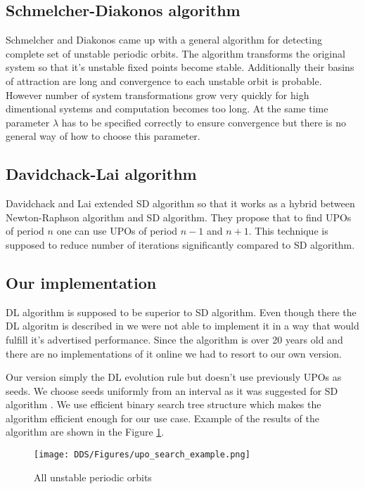 \subsection{Schmelcher-Diakonos algorithm}
Schmelcher and Diakonos came up with a general algorithm for detecting complete set of unstable periodic orbits.
The algorithm transforms the original system so that it's unstable fixed points become stable.
Additionally their basins of attraction are long and convergence to each unstable orbit is probable.
However number of system transformations grow very quickly for high dimentional systems and computation becomes too long.
At the same time parameter $\lambda$ has to be specified correctly to ensure convergence but there is no general way of how to choose this parameter. \cite{Schmelcher1997}

\subsection{Davidchack-Lai algorithm}
Davidchack and Lai extended SD algorithm so that it works as a hybrid between Newton-Raphson algorithm and SD algorithm.
They propose that to find UPOs of period $n$ one can use UPOs of period $n-1$ and $n+1$.
This technique is supposed to reduce number of iterations significantly compared to SD algorithm. \cite{Davidchack1999}

\subsection{Our implementation}
DL algorithm is supposed to be superior to SD algorithm.
Even though there the DL algoritm is described in \cite{Davidchack1999,Davidchack2001,Klebanoff2001} we were not able to implement it in a way that would fulfill it's advertised performance.
Since the algorithm is over 20 years old and there are no implementations of it online we had to resort to our own version.
\par
Our version simply the DL evolution rule but doesn't use previously UPOs as seeds.
We choose seeds uniformly from an interval as it was suggested for SD algorithm \cite{Schmelcher1997}.
We use efficient binary search tree structure which makes the algorithm efficient enough for our use case.
Example of the results of the algorithm are shown in the Figure \ref{fig:upo_search_example}.

\begin{figure}[!h]
    \centering
    \texttt{[image: DDS/Figures/upo\_search\_example.png]}
    \caption{All unstable periodic orbits}
    \label{fig:upo_search_example}
\end{figure}


